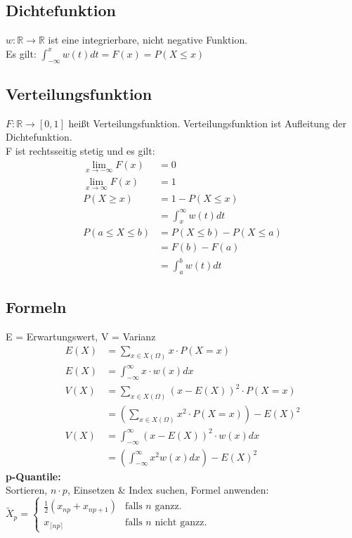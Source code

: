 \documentclass[a4paper, landscape, 10pt]{article}
\newcommand{\limFromTo}[2]{ \lim\limits_{#2 \rightarrow #1}}
\begin{document}
\begin{multicols}{4}
\begin{small}
	    \subsection{Dichtefunktion}
	    	$w: \mathbb{R} \rightarrow \mathbb{R}$ ist eine integrierbare, nicht negative Funktion. \\
	    	Es gilt: $\int_{-\infty}^{x} w(t) dt = F(x) = P(X \leq x)$
	    \subsection{Verteilungsfunktion}
	    	$F: \mathbb{R} \rightarrow \left[0,1\right]$ heißt Verteilungsfunktion. Verteilungsfunktion ist Aufleitung der Dichtefunktion.\\
	    	F ist rechtsseitig stetig und es gilt:
	    	\begin{align*}
	    		\limFromTo{-\infty}{x} F(x) &= 0\\
	    		\limFromTo{\infty}{x} F(x) &= 1\\
	    		P(X \geq x) &= 1 - P(X \leq x) \\
	    					&= \int_{x}^{\infty} w(t)dt\\
	    		P(a \le X \le b) &= P(X \le b) - P(X \le a)\\
	    						 &= F(b) - F(a) \\
	    						 &= \int_{a}^{b} w(t)dt
	    	\end{align*}
	    \subsection{Formeln}
	    E = Erwartungswert, V = Varianz
		    \begin{align*}
		    	E(X) &= \sum_{x \in X(\Omega)} x \cdot P(X = x)\\
		    	E(X) &= \int_{-\infty}^{\infty} x \cdot w(x) dx\\
		    	V(X) &= \sum_{x \in X(\Omega)} (x - E(X))^2 \cdot P(X = x)\\
		    		 &= \left(\sum_{x \in X(\Omega)} x^2 \cdot P(X = x)\right) - E(X)^2\\
		    	V(X) &= \int_{-\infty}^{\infty} (x - E(X))^2 \cdot w(x) dx\\
		    		 &= \left(\int_{-\infty}^{\infty} x^2 w(x) dx \right) - E(X)^2	 
		    \end{align*}
		    \textbf{p-Quantile:}\\
		    Sortieren, $n\cdot p$, Einsetzen \& Index suchen, Formel anwenden:\\
			$\widetilde{X}_p=
			\begin{cases}
			\frac{1}{2}(x_{np}+x_{np+1}) & \text{falls } n \text{ ganzz.}\\
			x_{\lceil{np}\rceil} & \text{falls } n \text{ nicht ganzz.}
			\end{cases}$
			

\end{small}
\end{multicols}
\end{document}
